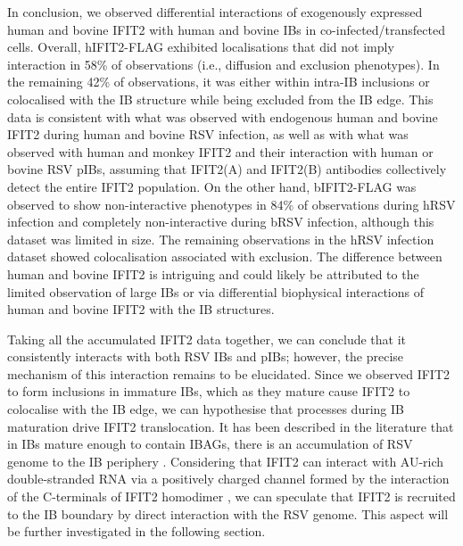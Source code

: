 In conclusion, we observed differential interactions of exogenously expressed human and bovine IFIT2 with human and bovine IBs in co-infected/transfected cells. Overall, hIFIT2-FLAG exhibited localisations that did not imply interaction in 58\% of observations (i.e., diffusion and exclusion phenotypes). In the remaining 42\% of observations, it was either within intra-IB inclusions or colocalised with the IB structure while being excluded from the IB edge. This data is consistent with what was observed with endogenous human and bovine IFIT2 during human and bovine RSV infection, as well as with what was observed with human and monkey IFIT2 and their interaction with human or bovine RSV pIBs, assuming that IFIT2(A) and IFIT2(B) antibodies collectively detect the entire IFIT2 population. On the other hand, bIFIT2-FLAG was observed to show non-interactive phenotypes in 84\% of observations during hRSV infection and completely non-interactive during bRSV infection, although this dataset was limited in size. The remaining observations in the hRSV infection dataset showed colocalisation associated with exclusion. The difference between human and bovine IFIT2 is intriguing and could likely be attributed to the limited observation of large IBs or via differential biophysical interactions of human and bovine IFIT2 with the IB structures.

Taking all the accumulated IFIT2 data together, we can conclude that it consistently interacts with both RSV IBs and pIBs; however, the precise mechanism of this interaction remains to be elucidated. Since we observed IFIT2 to form inclusions in immature IBs, which as they mature cause IFIT2 to colocalise with the IB edge, we can hypothesise that processes during IB maturation drive IFIT2 translocation. It has been described in the literature that in IBs mature enough to contain IBAGs, there is an accumulation of RSV genome to the IB periphery \cite{Rincheval2017FunctionalVirus}. Considering that IFIT2 can interact with AU-rich double-stranded RNA via a positively charged channel formed by the interaction of the C-terminals of IFIT2 homodimer \cite{Yang2012CrystalMechanisms, Vladimer2014IFITs:Proteins}, we can speculate that IFIT2 is recruited to the IB boundary by direct interaction with the RSV genome. This aspect will be further investigated in the following section.

